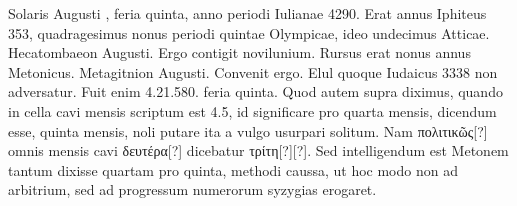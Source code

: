 Solaris Augusti , feria quinta, anno periodi Iulianae 4290.
Erat
annus Iphiteus 353, quadragesimus nonus periodi quintae Olympicae,
ideo undecimus Atticae.
Hecatombaeon  Augusti.
Ergo  contigit
novilunium.
Rursus erat nonus annus Metonicus.
Metagitnion  Augusti.
Convenit ergo.
Elul quoque Iudaicus 3338 non
adversatur.
Fuit enim 4.21.580. feria quinta.
Quod autem supra
diximus, quando in cella cavi mensis scriptum est 4.5, id significare
pro quarta mensis, dicendum esse, quinta mensis, noli putare ita a vulgo
usurpari solitum.
Nam \textgreek{πολιτικῶς[?]} omnis mensis cavi
 \textgreek{δευτέρα[?]} dicebatur
\textgreek{τρίτη[?][?]}.
Sed intelligendum est Metonem tantum dixisse quartam
pro quinta, methodi caussa, ut hoc modo non ad arbitrium, sed
ad progressum numerorum syzygias erogaret.

